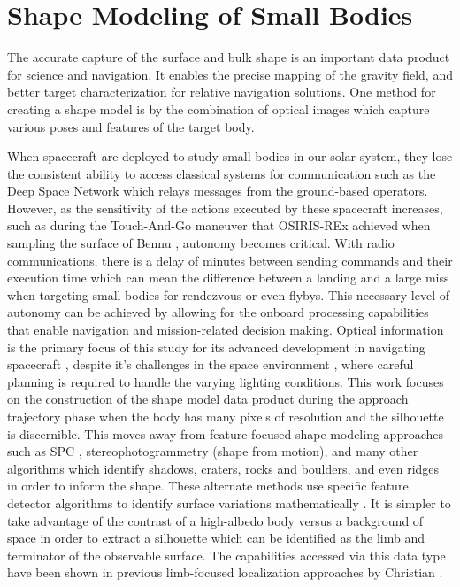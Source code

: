 \section{Shape Modeling of Small Bodies}
The accurate capture of the surface and bulk shape is an important data product for science and navigation. It enables the precise mapping of the gravity field, and better target characterization for relative navigation solutions. One method for creating a shape model is by the combination of optical images which capture various poses and features of the target body. 


When spacecraft are deployed to study small bodies in our solar system, they lose the consistent ability to access classical systems for communication such as the Deep Space Network which relays messages from the ground-based operators. However, as the sensitivity of the actions executed by these spacecraft increases, such as during the Touch-And-Go maneuver that OSIRIS-REx achieved when sampling the surface of Bennu \cite{Berry2013}, autonomy becomes critical. With radio communications, there is a delay of minutes between sending commands and their execution time which can mean the difference between a landing and a large miss when targeting small bodies for rendezvous or even flybys. This necessary level of autonomy can be achieved by allowing for the onboard processing capabilities that enable navigation and mission-related decision making. Optical information is the primary focus of this study for its advanced development in navigating spacecraft \cite{Owen2011}, despite it's challenges in the space environment \cite{DellaGiustina2018}, where careful planning is required to handle the varying lighting conditions. This work focuses on the construction of the shape model data product during the approach trajectory phase when the body has many pixels of resolution and the silhouette is discernible. This moves away from feature-focused shape modeling approaches such as SPC \cite{Gaskell2008}, stereophotogrammetry (shape from motion)\cite{Hartley2000}, and many other algorithms which identify shadows, craters, rocks and boulders, and even ridges in order to inform the shape. These alternate methods use specific feature detector algorithms to identify surface variations mathematically \cite{Lowe2004}. It is simpler to take advantage of the contrast of a high-albedo body versus a background of space in order to extract a silhouette which can be identified as the limb and terminator of the observable surface. The capabilities accessed via this data type have been shown in previous limb-focused localization approaches by Christian \cite{Christian2017}. 

